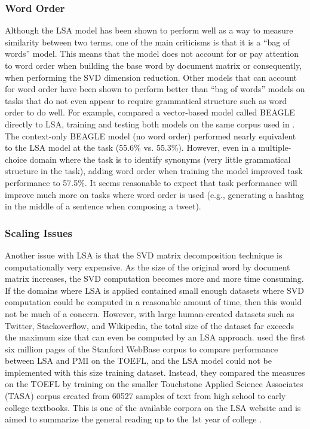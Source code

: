\documentclass[man,floatsintext,donotrepeattitle]{apa6}
\begin{document}
\subsubsection{Word Order}

Although the LSA model has been shown to perform well as a way to measure similarity between two terms, one of the main criticisms is that it is a ``bag of words'' model.
This means that the model does not account for or pay attention to word order when building the base word by document matrix or consequently, when performing the SVD dimension reduction.
Other models that can account for word order have been shown to perform better than ``bag of words'' models on tasks that do not even appear to require grammatical structure such as word order to do well.
For example, \textcite{Jones2007} compared a vector-based model called BEAGLE directly to LSA, training and testing both models on the same corpus used in \textcite{Landauer1997}.
The context-only BEAGLE model (no word order) performed nearly equivalent to the LSA model at the task (\num{55.6}\% vs. \num{55.3}\%).
However, even in a multiple-choice domain where the task is to identify synonyms (very little grammatical structure in the task), adding word order when training the model improved task performance to \num{57.5}\%.
It seems reasonable to expect that task performance will improve much more on tasks where word order is used (e.g., generating a hashtag in the middle of a sentence when composing a tweet).

\subsubsection{Scaling Issues}

Another issue with LSA is that the SVD matrix decomposition technique is computationally very expensive.
As the size of the original word by document matrix increases, the SVD computation becomes more and more time consuming.
If the domains where LSA is applied contained small enough datasets where SVD computation could be computed in a reasonable amount of time, then this would not be much of a concern.
However, with large human-created datasets such as Twitter, Stackoverflow, and Wikipedia, the total size of the dataset far exceeds the maximum size that can even be computed by an LSA approach.
\textcite{Budiu2007} used the first six million pages of the Stanford WebBase corpus to compare performance between LSA and PMI on the TOEFL, and the LSA model could not be implemented with this size training dataset.
Instead, they compared the measures on the TOEFL by training on the smaller Touchstone Applied Science Associates (TASA) corpus created from \num{60527} samples of text from high school to early college textbooks.
This is one of the available corpora on the LSA website and is aimed to summarize the general reading up to the 1st year of college \parencite{Budiu2007}.
\end{document}
